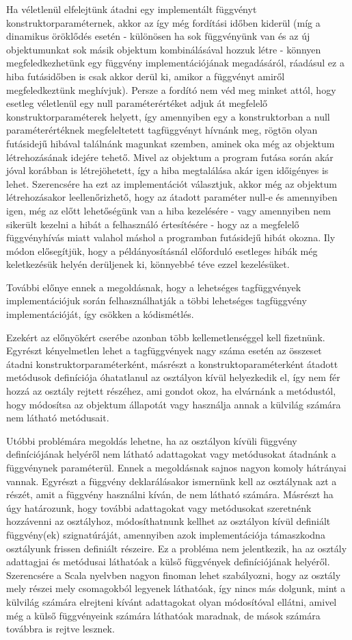 Ha véletlenül elfelejtünk átadni egy implementált függvényt konstruktorparaméternek, akkor az így még fordítási időben kiderül
(míg a dinamikus öröklődés esetén - különösen ha sok függvényünk van és az új objektumunkat sok másik objektum kombinálásával
hozzuk létre - könnyen megfeledkezhetünk egy függvény implementációjának megadásáról, ráadásul ez a hiba futásidőben is csak akkor derül ki,
amikor a függvényt amiről megfeledkeztünk meghívjuk). Persze a fordító nem véd meg minket attól, hogy esetleg véletlenül egy null
paraméterértéket adjuk át megfelelő konstruktorparaméterek helyett, így amennyiben egy a konstruktorban a null paraméterértéknek
megfeleltetett tagfüggvényt hívnánk meg, rögtön olyan futásidejű hibával találnánk magunkat szemben, aminek oka még az objektum létrehozásának
idejére tehető. Mivel az objektum a program futása során akár jóval korábban is létrejöhetett, így a hiba megtalálása akár igen
időigényes is lehet. Szerencsére ha ezt az implementációt választjuk, akkor még az objektum létrehozásakor leellenőrizhető,
hogy az átadott paraméter null-e és amennyiben igen, még az előtt lehetőségünk van a hiba kezelésére - vagy amennyiben nem sikerült kezelni a hibát a
felhasználó értesítésére - hogy az a megfelelő függvényhívás miatt valahol máshol a programban futásidejű hibát okozna.
Ily módon elősegítjük, hogy a példányosításnál előforduló esetleges hibák még keletkezésük helyén derüljenek ki,
könnyebbé téve ezzel kezelésüket.

További előnye ennek a megoldásnak, hogy a lehetséges tagfüggvények implementációjuk során felhasználhatják a többi lehetséges tagfüggvény
implementációját, így csökken a kódismétlés.

Ezekért az előnyökért cserébe azonban több kellemetlenséggel kell fizetnünk. Egyrészt kényelmetlen lehet a tagfüggvények nagy
száma esetén az összeset átadni konstruktorparaméterként, másrészt a konstruktoparaméterként átadott metódusok definíciója óhatatlanul
az osztályon kívül helyezkedik el, így nem fér hozzá az osztály rejtett részéhez, ami gondot okoz, ha elvárnánk a metódustól, hogy
módosítsa az objektum állapotát vagy használja annak a külvilág számára nem látható metódusait.

Utóbbi problémára megoldás lehetne, ha az osztályon kívüli függvény definíciójának helyéről nem látható adattagokat
vagy metódusokat átadnánk a függvénynek paraméterül. Ennek a megoldásnak sajnos nagyon komoly hátrányai vannak. Egyrészt
a függvény deklarálásakor ismernünk kell az osztálynak azt a részét, amit a függvény használni kíván,
de nem látható számára. Másrészt ha úgy határozunk, hogy további adattagokat vagy metódusokat szeretnénk hozzávenni az osztályhoz,
módosíthatnunk kellhet az osztályon kívül definiált függvény(ek) szignatúráját, amennyiben azok implementációja támaszkodna
osztályunk frissen definiált részeire. Ez a probléma nem jelentkezik, ha az osztály adattagjai és metódusai láthatóak
a külső függvények definíciójának helyéről. Szerencsére a Scala nyelvben nagyon finoman lehet szabályozni, hogy az osztály
mely részei mely csomagokból legyenek láthatóak, így nincs más dolgunk, mint a külvilág számára elrejteni kívánt adattagokat
olyan módosítóval ellátni, amivel még a külső függvényeink számára láthatóak maradnak, de mások számára
továbbra is rejtve lesznek.

